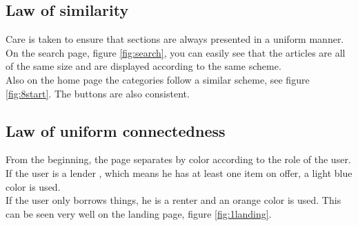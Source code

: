 \subsection{Law of similarity}
Care is taken to ensure that sections are always presented in a uniform manner. On the search page, figure \ref{fig:search}, you can easily see that the articles are all of the same size and are displayed according to the same scheme.\\
 Also on the home page the categories follow a similar scheme, see figure \ref{fig:8start}. The buttons are also consistent.
\subsection{Law of uniform connectedness}


From the beginning, the page separates by color according to the role of the user. If the user is a \textcolor{lender}{lender} , which means he has at least one item on offer, a light blue color is used. \\ If the user only borrows things, he is a \textcolor{renter}{renter} and an orange color is used. This can be seen very well on the landing page, figure \ref{fig:1landing}.

